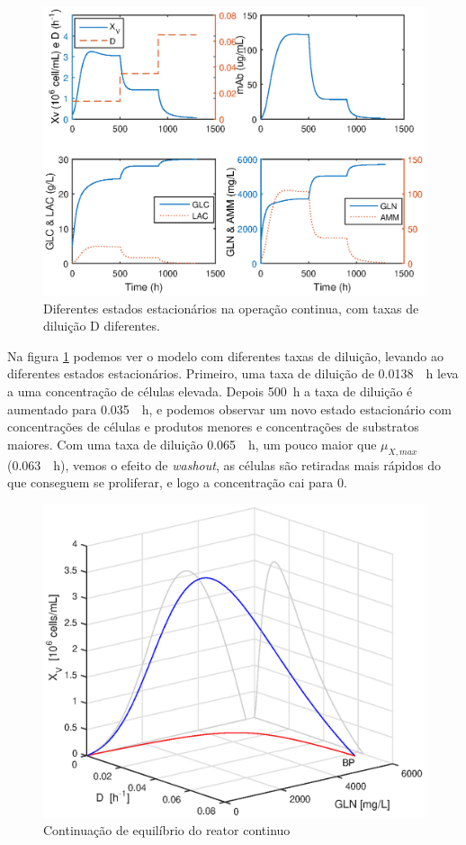 \documentclass[fleqn,10pt]{SelfArx} %
\begin{document}
\begin{figure}[ht]\centering
	\includegraphics[width=\linewidth]{model3_d}
	\caption{Diferentes estados estacionários na operação continua, com taxas de diluição D diferentes.}
	\label{fig:model3_d}
\end{figure}

Na figura \ref{fig:model3_d} podemos ver o modelo com diferentes taxas de diluição, levando ao diferentes estados estacionários. Primeiro, uma taxa de diluição de \SI{0.0138}{\per\hour} leva a uma concentração de células elevada. Depois \SI{500}{\hour} a taxa de diluição é aumentado para \SI{0.035}{\per\hour}, e podemos observar um novo estado estacionário com concentrações de células e produtos menores e concentrações de substratos maiores. Com uma taxa de diluição \SI{0.065}{\per\hour}, um pouco maior que $\mu _{X,max}$ (\SI{0.063}{\per\hour}), vemos o efeito de \textit{washout}, as células são retiradas mais rápidos do que conseguem se proliferar, e logo a concentração cai para 0.

\begin{figure}[ht]\centering
	\includegraphics[width=\linewidth]{matcont}
	\setlength{\abovecaptionskip}{3pt}
	\caption{Continuação de equilíbrio do reator continuo}
	\label{fig:matcont}
\end{figure}
\end{document}
